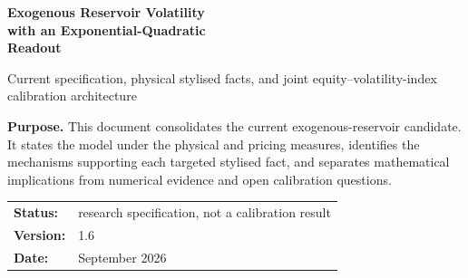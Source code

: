 \documentclass[11pt,a4paper]{article}
\begin{document}
\hypersetup{pageanchor=false}
\begin{titlepage}

\vspace*{24mm}
{\color{navy}\fontsize{27}{32}\selectfont\bfseries
Exogenous Reservoir Volatility\\[2mm]
with an Exponential-Quadratic\\[2mm]
Readout\par}

\vspace{8mm}
{\Large\color{muted}
Current specification, physical stylised facts, and joint equity--volatility-index calibration architecture\par}

\vspace{15mm}
\begin{tcolorbox}[colback=pale,colframe=blue,boxrule=0.8pt,arc=2mm]
\textbf{Purpose.}
This document consolidates the current exogenous-reservoir candidate. It states the model
under the physical and pricing measures, identifies the mechanisms supporting each targeted
stylised fact, and separates mathematical implications from numerical evidence and open
calibration questions.
\end{tcolorbox}

\vfill
\begin{tabular}{@{}ll@{}}
\textbf{Status:} & research specification, not a calibration result \\
\textbf{Version:} & 1.6 \\
\textbf{Date:} & September 2026
\end{tabular}
\end{titlepage}
\hypersetup{pageanchor=true}

\end{document}
